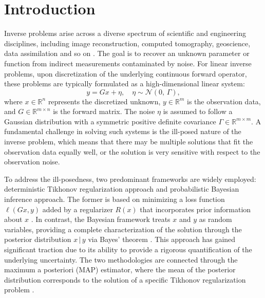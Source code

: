 \documentclass[]{myarticle}
\begin{document}
\section{Introduction} 
Inverse problems arise across a diverse spectrum of scientific and engineering disciplines, including image reconstruction, computed tomography, geoscience, data assimilation and so on \cite{Hansen2006,Kaip2006,Buzug2008,Law2015,Richter2016}. The goal is to recover an unknown parameter or function from indirect measurements contaminated by noise. For linear inverse problems, upon discretization of the underlying continuous forward operator, these problems are typically formulated as a high-dimensional linear system:
\begin{equation}\label{inverse1}
  y = Gx + \eta,   \quad  \eta \sim \mathcal{N}(0,\,\Gamma),
\end{equation}
where $x \in \mathbb{R}^n$ represents the discretized unknown, $y \in \mathbb{R}^m$ is the observation data, and $G \in \mathbb{R}^{m \times n}$ is the forward matrix. The noise $\eta$ is assumed to follow a Gaussian distribution with a symmetric positive definite covariance $\Gamma \in \mathbb{R}^{m \times m}$. A fundamental challenge in solving such systems is the ill-posed nature of the inverse problem, which means that there may be multiple solutions that fit the observation data equally well, or the solution is very sensitive with respect to the observation noise. 

To address the ill-posedness, two predominant frameworks are widely employed: deterministic Tikhonov regularization approach and probabilistic Bayesian inference approach. The former is based on minimizing a loss function $\ell(Gx, y)$ added by a regularizer $R(x)$ that incorporates prior information about $x$ \cite{Tikhonov1977,Engl2000,hansen2010discrete}. In contrast, the Bayesian framework treats $x$ and $y$ as random variables, providing a complete characterization of the solution through the posterior distribution $x\,|\,y$ via Bayes' theorem \cite{Kaip2006,Stuart2010}. This approach has gained significant traction due to its ability to provide a rigorous quantification of the underlying uncertainty. The two methodologies are connected through the maximum a posteriori (MAP) estimator, where the mean of the posterior distribution corresponds to the solution of a specific Tikhonov regularization problem \cite{Kaip2006,dashti2013map,helin2015maximum}. 
\end{document}
